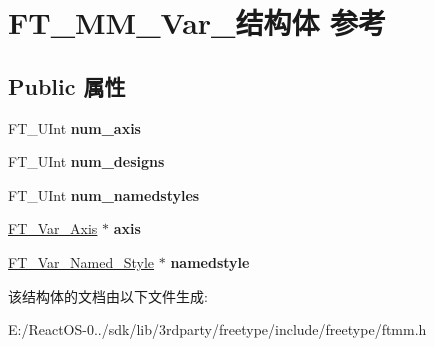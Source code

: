 \hypertarget{struct_f_t___m_m___var__}{}\section{F\+T\+\_\+\+M\+M\+\_\+\+Var\+\_\+结构体 参考}
\label{struct_f_t___m_m___var__}
\subsection*{Public 属性}
\begin{DoxyCompactItemize}
\item 
\mbox{\label{struct_f_t___m_m___var___acd32d4eb128f6fd9f6fde7da4c7b99bf}} 
F\+T\+\_\+\+U\+Int {\bfseries num\+\_\+axis}
\item 
\mbox{\label{struct_f_t___m_m___var___a5109a6a20626d90ed44cd64363d29e92}} 
F\+T\+\_\+\+U\+Int {\bfseries num\+\_\+designs}
\item 
\mbox{\label{struct_f_t___m_m___var___ac54bdd53447f4967b5d3b1a341a4bdff}} 
F\+T\+\_\+\+U\+Int {\bfseries num\+\_\+namedstyles}
\item 
\mbox{\label{struct_f_t___m_m___var___a19cc7772e057dad1c4acd6e744328466}} 
\hyperlink{struct_f_t___var___axis__}{F\+T\+\_\+\+Var\+\_\+\+Axis} $\ast$ {\bfseries axis}
\item 
\mbox{\label{struct_f_t___m_m___var___acda1ec5211250ddc06ec090f695adabf}} 
\hyperlink{struct_f_t___var___named___style__}{F\+T\+\_\+\+Var\+\_\+\+Named\+\_\+\+Style} $\ast$ {\bfseries namedstyle}
\end{DoxyCompactItemize}


该结构体的文档由以下文件生成\+:\begin{DoxyCompactItemize}
\item 
E\+:/\+React\+O\+S-\/0../sdk/lib/3rdparty/freetype/include/freetype/ftmm.\+h\end{DoxyCompactItemize}
